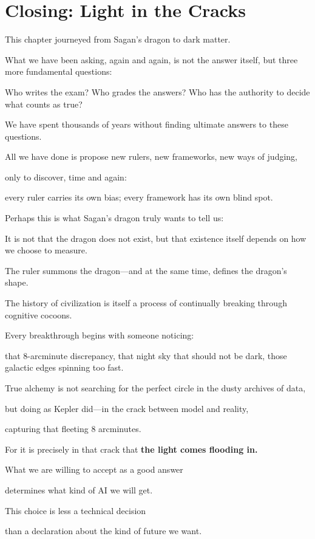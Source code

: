 \newpage
\section{Closing: Light in the Cracks}

This chapter journeyed from Sagan's dragon to dark matter.

What we have been asking, again and again, is not the answer itself, but three more fundamental questions:

Who writes the exam?
Who grades the answers?
Who has the authority to decide what counts as true?

\vspace{1em}

We have spent thousands of years without finding ultimate answers to these questions.

All we have done is propose new rulers, new frameworks, new ways of judging,

only to discover, time and again:

every ruler carries its own bias; every framework has its own blind spot.

\vspace{1em}

Perhaps this is what Sagan's dragon truly wants to tell us:

It is not that the dragon does not exist, but that existence itself depends on how we choose to measure.

The ruler summons the dragon---and at the same time, defines the dragon's shape.

\vspace{1em}

The history of civilization is itself a process of continually breaking through cognitive cocoons.

Every breakthrough begins with someone noticing:

that 8-arcminute discrepancy, that night sky that should not be dark, those galactic edges spinning too fast.

True alchemy is not searching for the perfect circle in the dusty archives of data,

but doing as Kepler did---in the crack between model and reality,

capturing that fleeting 8 arcminutes.

\vspace{1em}

For it is precisely in that crack that \textbf{the light comes flooding in.}

\begin{thinkbox}
What we are willing to accept as a good answer

determines what kind of AI we will get.

This choice is less a technical decision

than a declaration about the kind of future we want.
\end{thinkbox}
